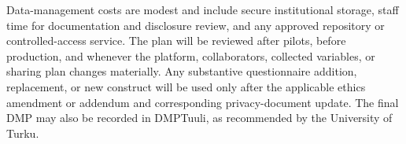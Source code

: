 Data-management costs are modest and include secure institutional storage, staff time for documentation and disclosure review, and any approved repository or controlled-access service. The plan will be reviewed after pilots, before production, and whenever the platform, collaborators, collected variables, or sharing plan changes materially. Any substantive questionnaire addition, replacement, or new construct will be used only after the applicable ethics amendment or addendum and corresponding privacy-document update. The final DMP may also be recorded in DMPTuuli, as recommended by the University of Turku.


